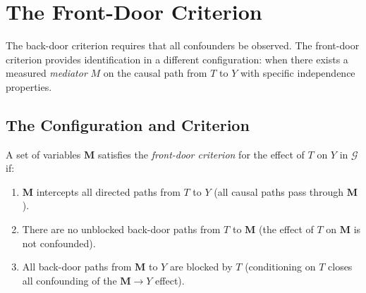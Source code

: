 \documentclass[
  a4paper,
]{book}
\providecommand{\tightlist}{%
  \setlength{\itemsep}{0pt}\setlength{\parskip}{0pt}}
\newcommand{\Gcal}{\mathcal{G}}
\begin{document}
\section{The Front-Door Criterion}\label{sec-frontdoor}

The back-door criterion requires that all confounders be observed. The
front-door criterion provides identification in a different
configuration: when there exists a measured \emph{mediator} \(M\) on the
causal path from \(T\) to \(Y\) with specific independence properties.

\subsection{The Configuration and
Criterion}\label{the-configuration-and-criterion}

\begin{tcolorbox}[enhanced jigsaw, arc=.35mm, bottomrule=.15mm, bottomtitle=1mm, breakable, colback=white, colbacktitle=quarto-callout-note-color!10!white, colframe=quarto-callout-note-color-frame, coltitle=black, left=2mm, leftrule=.75mm, opacityback=0, opacitybacktitle=0.6, rightrule=.15mm, title={Definition: Front-Door Criterion}, titlerule=0mm, toprule=.15mm, toptitle=1mm]

A set of variables \(\mathbf{M}\) satisfies the \emph{front-door
criterion} for the effect of \(T\) on \(Y\) in \(\Gcal\) if:

\begin{enumerate}
\def\labelenumi{\arabic{enumi}.}
\tightlist
\item
  \(\mathbf{M}\) intercepts all directed paths from \(T\) to \(Y\) (all
  causal paths pass through \(\mathbf{M}\)).
\item
  There are no unblocked back-door paths from \(T\) to \(\mathbf{M}\)
  (the effect of \(T\) on \(\mathbf{M}\) is not confounded).
\item
  All back-door paths from \(\mathbf{M}\) to \(Y\) are blocked by \(T\)
  (conditioning on \(T\) closes all confounding of the
  \(\mathbf{M} \to Y\) effect).
\end{enumerate}

\end{tcolorbox}
\end{document}
